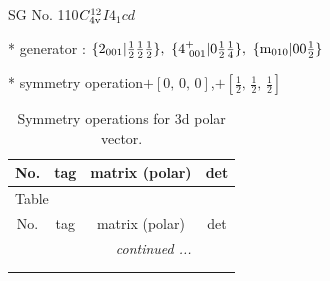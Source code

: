\documentclass[fleqn,8pt]{jsarticle}
\begin{document}
\setcounter{MaxMatrixCols}{32}

\renewcommand{\tablename}{Table~}
\renewcommand{\figurename}{Figure~}
\begin{center}
\LARGE
SG No. 110\quad$C_{\rm 4v}^{12}$\quad$I4_1cd$\quad[ tetragonal ]
\end{center}

* generator : $\{2{}_{001}|\frac{1}{2} \frac{1}{2} \frac{1}{2}\},\,\,\{4^{+}_{\,\,001}|0 \frac{1}{2} \frac{1}{4}\},\,\,\{{\rm m}_{010}|0 0 \frac{1}{2}\}$

* symmetry operation\quad$+\left[ 0,\, 0,\, 0 \right]$,\quad $+\left[ \frac{1}{2},\, \frac{1}{2},\, \frac{1}{2} \right]$
\renewcommand{\arraystretch}{1.3}
\begin{longtable}{cccc}
\caption{Symmetry operations for 3d polar vector.}
 \\
 \hline \hline
No. & tag & matrix (polar) & det \\ \hline \endfirsthead

\multicolumn{3}{l}{\tablename\ \thetable{}} \\
 \hline \hline
No. & tag & matrix (polar) & det \\ \hline \endhead

 \hline \hline
\multicolumn{3}{r}{\footnotesize\it continued ...} \\ \endfoot

 \hline \hline
\multicolumn{3}{r}{} \\ \endlastfoot


\end{longtable}
\end{document}
